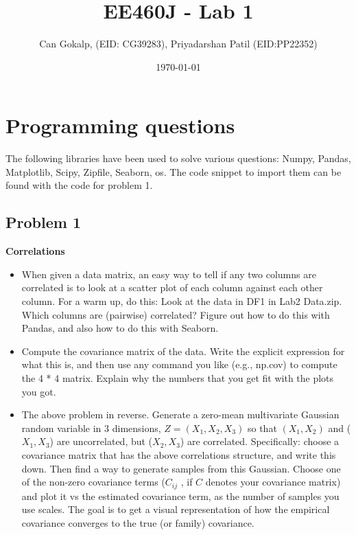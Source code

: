 \documentclass[12pt]{article}%
\begin{document}
\title{EE460J - Lab 1}
\author{Can Gokalp, (EID: CG39283), Priyadarshan Patil (EID:PP22352)}
\date{\today}
\maketitle

\section{Programming questions}

The following libraries have been used to solve various questions: Numpy, Pandas, Matplotlib, Scipy, Zipfile, Seaborn, os. The code snippet to import them can be found with the code for problem 1. 

\subsection{Problem 1}

\textbf{Correlations}\\
\begin{itemize}
\item When given a data matrix, an easy way to tell if any two columns are correlated is to look at a scatter plot of each column against each other column. For a warm up, do this: Look at the data in DF1 in Lab2 Data.zip. Which columns are (pairwise) correlated? Figure out how to do this with Pandas, and also how to do this with Seaborn.
\item Compute the covariance matrix of the data. Write the explicit expression for what this is, and then use any command you like (e.g., np.cov) to compute the 4 * 4 matrix. Explain why the numbers that you get fit with the plots you got.
\item The above problem in reverse. Generate a zero-mean multivariate Gaussian random variable in 3 dimensions, $Z = (X_1, X_2, X_3)$ so that $(X_1, X_2)$ and ($X_1, X_3$) are uncorrelated, but ($X_2, X_3$) are correlated. Specifically: choose a covariance matrix that has the above correlations structure, and write this down. Then find a way to generate samples from this Gaussian. Choose one of the non-zero covariance terms ($C_{ij}$ , if $C$ denotes your covariance matrix) and plot it vs the estimated covariance term, as the number of samples you use scales. The goal is to get a visual representation of how the empirical covariance converges to the true (or family) covariance.\\

\end{itemize}
\end{document}

